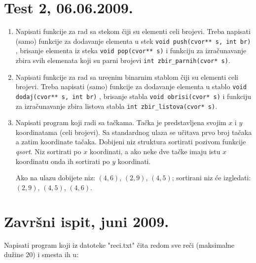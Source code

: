 \section{Test 2, 06.06.2009.}



\begin{enumerate}
\item
Napisati funkcije za rad sa stekom \v{c}iji su elementi celi
brojevi. Treba napisati (samo) funkcije za dodavanje elementa u
stek \verb+void push(cvor** s, int br)+ , brisanje elementa iz
steka \verb+void pop(cvor** s)+ i funkciju za izra\v cunavanje
zbira svih elemenata koji su parni brojevi
\verb+int zbir_parnih(cvor* s)+.

\item Napisati funkcije za rad sa ure\d enim binarnim stablom \v{c}iji su
elementi celi brojevi. Treba napisati (samo) funkcije za dodavanje
elementa u stablo \verb+void dodaj(cvor** s, int br)+ , brisanje
stabla \verb+void obrisi(cvor* s)+ i funkciju za izra\v cunavanje
zbira listova stabla \verb+int zbir_listova(cvor* s)+.

\item
Napisati program koji radi sa ta\v ckama. Ta\v cka je
predstavljena svojim $x$ i $y$ koordinatama (celi brojevi). Sa
standardnog ulaza se u\v citava prvo broj ta\v caka a zatim
koordinate ta\v caka. Dobijeni niz struktura sortirati pozivom
funkcije \emph{qsort}. Niz sortirati po $x$ koordinati, a ako neke dve
ta\v cke imaju istu $x$ koordinatu onda ih sortirati po $y$ koordinati.

Ako na ulazu dobijete niz: $(4,6)$, $(2,9)$, $(4,5)$; sortirani niz \' ce
izgledati: $(2,9)$, $(4,5)$, $(4,6)$.

\end{enumerate}




\section{Zavr\v{s}ni ispit, juni 2009.}



Napisati program koji iz datoteke "reci.txt" \v cita redom sve
re\v ci (maksimalne du\v zine $20$) i smesta ih u:

